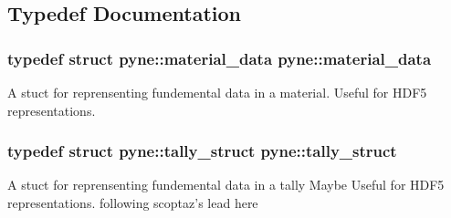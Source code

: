 \subsection{Typedef Documentation}
\hypertarget{namespacepyne_a30fee8818307aa6d8d45dc33ddee6008}{
\subsubsection[{material\+\_\+data}]{\setlength{\rightskip}{0pt plus 5cm}typedef struct {\bf pyne\+::material\+\_\+data}  {\bf pyne\+::material\+\_\+data}}}\label{namespacepyne_a30fee8818307aa6d8d45dc33ddee6008}
A stuct for reprensenting fundemental data in a material. Useful for H\+D\+F5 representations. \hypertarget{namespacepyne_a50f65e8f1e109c362c1cd737d0627941}{
\subsubsection[{tally\+\_\+struct}]{\setlength{\rightskip}{0pt plus 5cm}typedef struct {\bf pyne\+::tally\+\_\+struct}  {\bf pyne\+::tally\+\_\+struct}}}\label{namespacepyne_a50f65e8f1e109c362c1cd737d0627941}
A stuct for reprensenting fundemental data in a tally Maybe Useful for H\+D\+F5 representations. following scoptaz's lead here 

